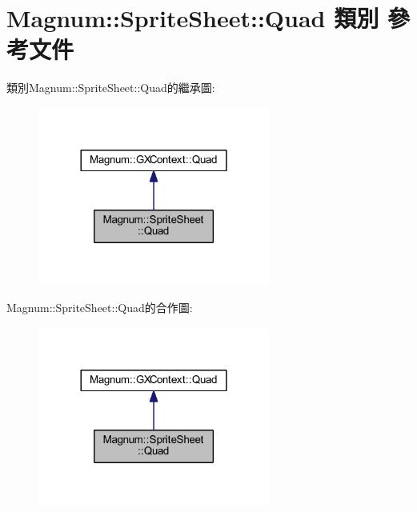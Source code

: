 \hypertarget{class_magnum_1_1_sprite_sheet_1_1_quad}{}\section{Magnum\+:\+:Sprite\+Sheet\+:\+:Quad 類別 參考文件}
\label{class_magnum_1_1_sprite_sheet_1_1_quad}


類別\+Magnum\+:\+:Sprite\+Sheet\+:\+:Quad的繼承圖\+:\nopagebreak
\begin{figure}[H]
\begin{center}
\leavevmode
\includegraphics[width=216pt]{class_magnum_1_1_sprite_sheet_1_1_quad__inherit__graph}
\end{center}
\end{figure}


Magnum\+:\+:Sprite\+Sheet\+:\+:Quad的合作圖\+:\nopagebreak
\begin{figure}[H]
\begin{center}
\leavevmode
\includegraphics[width=216pt]{class_magnum_1_1_sprite_sheet_1_1_quad__coll__graph}
\end{center}
\end{figure}

